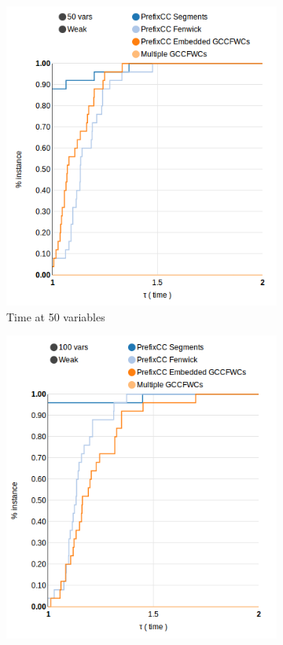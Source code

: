 \documentclass[a4paper,10pt]{article}
\begin{document}
\begin{figure}[h]
    \centering
    \begin{subfigure}[b]{0.3\textwidth}
        \includegraphics[width=\textwidth]{img/weak-50vars-time}
        \caption{Time at 50 variables}
    \end{subfigure}
    \quad
    \begin{subfigure}[b]{0.3\textwidth}
        \includegraphics[width=\textwidth]{img/weak-100vars-time}

\end{subfigure}
\end{figure}
\end{document}
